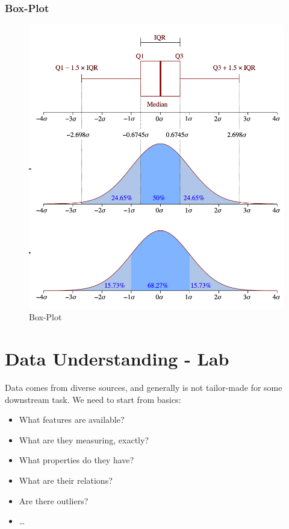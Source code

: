 \subsubsection{Box-Plot}
\begin{figure}[htbp]
   \centering
   \includegraphics{images/01/boxplot.png}
   \caption{Box-Plot}
   \label{fig:01/boxplot}
\end{figure}
\section{Data Understanding - Lab}

Data comes from diverse sources, and generally is not tailor-made for some downstream task. We need to start from basics:
\begin{itemize}
	\item What features are available?
	\item What are they measuring, exactly?
	\item What properties do they have?
	\item What are their relations?
	\item Are there outliers?
	\item \dots
\end{itemize}

